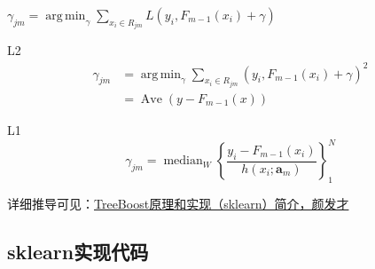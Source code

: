 \begin{frame}
    $\gamma_{jm} = \operatorname{arg \, min}_{\gamma} \sum_{x_i \in R_{jm}} L(y_i, F_{m-1}(x_i) + \gamma)$

    \vfill

    \begin{block}{L2}
        \begin{align*}
            \gamma_{jm} &= \operatorname{arg \, min}_{\gamma} \sum_{x_i \in R_{jm}} (y_i, F_{m-1}(x_i) + \gamma)^2 \\
                        &= \operatorname{Ave} (y - F_{m-1}(x))
        \end{align*}
    \end{block}

    \begin{block}{L1}
        \begin{equation*}
            \gamma_{jm} = \operatorname{median}_W \left \{ \frac{y_i - F_{m-1}(x_i)}{h(x_i; \mathbf{a}_m)} \right \}_1^N
        \end{equation*}
    \end{block}
    {\tiny
    详细推导可见：\href{http://nbviewer.jupyter.org/github/facaiy/book_notes/blob/master/machine_learning/tree/gbdt/treeboost/intro.ipynb}{TreeBoost原理和实现（sklearn）简介，颜发才}}
\end{frame}


\subsection{sklearn实现代码}


